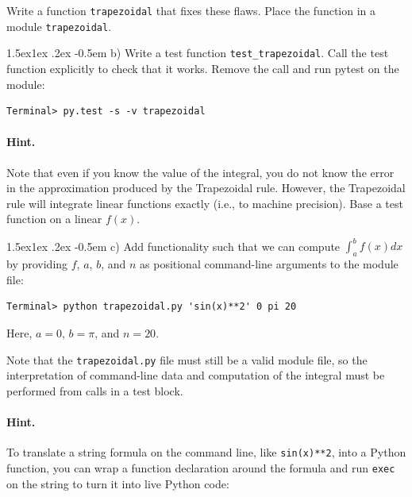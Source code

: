 \documentclass[%
oneside,                 %
final,                   %
10pt]{article}
\makeatletter
\newenvironment{doconceexercise}{}{}
\newcommand\subex{\@startsection{paragraph}{4}{\z@}%
                  {1.5ex\@plus1ex \@minus.2ex}%
                  {-0.5em}%
                  {\normalfont\normalsize\bfseries}}
\makeatother
\begin{document}
\begin{doconceexercise}
\noindent
Write a function \texttt{trapezoidal} that fixes these flaws.
Place the function in a module \texttt{trapezoidal}.

\subex{b)}
Write a test function \Verb!test_trapezoidal!. Call the test function
explicitly to check that it works. Remove the call and run pytest
on the module:

\begin{Verbatim}[frame=lines,label=\fbox{{\tiny Terminal}},framesep=2.5mm,framerule=0.7pt,fontsize=\fontsize{9pt}{9pt}]
Terminal> py.test -s -v trapezoidal
\end{Verbatim}


\paragraph{Hint.}
Note that even if you know the value of the integral, you do not know
the error in the approximation produced by the Trapezoidal rule.
However, the Trapezoidal rule will integrate linear functions
exactly (i.e., to machine precision). Base a test function
on a linear $f(x)$.


\subex{c)}
Add functionality such that we can compute $\int_a^b f(x)dx$ by providing
$f$, $a$, $b$, and $n$ as positional command-line arguments to the
module file:

\begin{Verbatim}[frame=lines,label=\fbox{{\tiny Terminal}},framesep=2.5mm,framerule=0.7pt,fontsize=\fontsize{9pt}{9pt}]
Terminal> python trapezoidal.py 'sin(x)**2' 0 pi 20
\end{Verbatim}
Here, $a=0$, $b=\pi$, and $n=20$.

Note that the \texttt{trapezoidal.py} file must still be a valid module file, so the
interpretation of command-line data and computation of the integral
must be performed from calls in a test block.


\paragraph{Hint.}
To translate a string formula on the command line, like \texttt{sin(x)**2},
into a Python function, you can wrap a function declaration around
the formula and run \texttt{exec} on the string to turn it into live Python code:


\end{doconceexercise}
\end{document}
